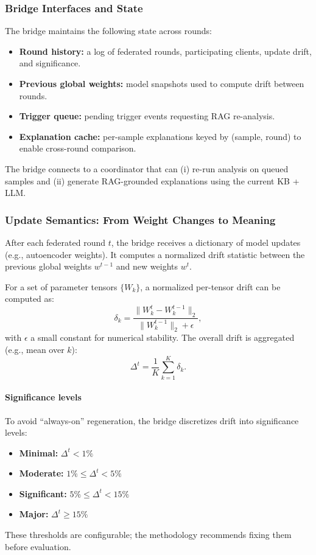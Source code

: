 \documentclass[conference]{IEEEtran}
\begin{document}
\subsubsection{Bridge Interfaces and State}
\label{sec:bridge-interfaces}

The bridge maintains the following state across rounds:
\begin{itemize}
  \item \textbf{Round history:} a log of federated rounds, participating clients, update drift, and significance.
  \item \textbf{Previous global weights:} model snapshots used to compute drift between rounds.
  \item \textbf{Trigger queue:} pending trigger events requesting RAG re-analysis.
  \item \textbf{Explanation cache:} per-sample explanations keyed by (sample, round) to enable cross-round comparison.
\end{itemize}

The bridge connects to a coordinator that can (i) re-run analysis on queued samples and (ii) generate RAG-grounded explanations using the current KB + LLM.

\subsubsection{Update Semantics: From Weight Changes to Meaning}
\label{sec:update-semantics}

After each federated round $t$, the bridge receives a dictionary of model updates (e.g., autoencoder weights). It computes a normalized drift statistic between the previous global weights $w^{t-1}$ and new weights $w^{t}$.

For a set of parameter tensors $\{W_k\}$, a normalized per-tensor drift can be computed as:
\begin{equation}
\delta_k = \frac{\lVert W_k^{t} - W_k^{t-1} \rVert_2}{\lVert W_k^{t-1} \rVert_2 + \epsilon},
\end{equation}
with $\epsilon$ a small constant for numerical stability. The overall drift is aggregated (e.g., mean over $k$):
\begin{equation}
\Delta^{t} = \frac{1}{K}\sum_{k=1}^{K} \delta_k.
\end{equation}

\paragraph{Significance levels}
To avoid ``always-on'' regeneration, the bridge discretizes drift into significance levels:
\begin{itemize}
  \item \textbf{Minimal:} $\Delta^{t} < 1\%$
  \item \textbf{Moderate:} $1\% \le \Delta^{t} < 5\%$
  \item \textbf{Significant:} $5\% \le \Delta^{t} < 15\%$
  \item \textbf{Major:} $\Delta^{t} \ge 15\%$
\end{itemize}
These thresholds are configurable; the methodology recommends fixing them before evaluation.
\end{document}
